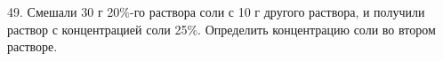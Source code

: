 49. Смешали 30 г 20$\%$-го раствора соли с 10 г другого раствора, и получили раствор с концентрацией соли 25$\%$. Определить концентрацию соли во втором растворе.\\
